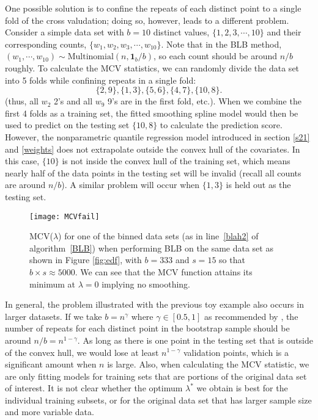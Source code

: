 \documentclass{statsoc}
\begin{document}
One possible solution is to confine the repeats of each distinct point to a single fold of the cross valudation; doing so, however, leads to a different problem. Consider a simple data set with $b=10$ distinct values, $\{1,2,3,\cdots,10\}$ and their corresponding counts, $\{w_1,w_2,w_3,\cdots,w_{10}\}$. Note that in the BLB method, $(w_1,\cdots,w_{10})\sim \text{Multinomial}(n,\mathbf{1}_b/b)$, so each count should be around $n/b$ roughly. To calculate the MCV statistics, we can randomly divide the data set into 5 folds while confining repeats in a single fold: 
$$\{2,9\},\{1,3\},\{5,6\},\{4,7\},\{10,8\}.$$
(thus, all $w_2$ 2's and all $w_9$ 9's are in the first fold, etc.). When we combine the first 4 folds as a training set, the fitted smoothing spline model would then be used to predict on the testing set $\{10,8\}$ to calculate the prediction score. However, the nonparametric quantile regression model introduced in section \ref{s21} and \ref{weights} does not extrapolate outside the convex hull of the covariates. In this case, $\{10\}$ is not inside the convex hull of the training set, which means nearly half of the data points in the testing set will be invalid (recall all counts are around $n/b$). A similar problem will occur when $\{1,3\}$ is held out as the testing set.
\begin{figure}[H]
\texttt{[image: MCVfail]}
\centering
\caption{MCV($\lambda$) for one of the binned data sets (as in line~\ref{blah2} of algorithm~\ref{BLB}) when performing BLB on the same data set as shown in Figure \ref{fig:edf}, with $b=333$ and $s=15$ so that $b\times s\approx 5000$. We can see that the MCV function attains its minimum at $\lambda=0$ implying no smoothing. 
}
\label{fig:badMCV}
\end{figure}

In general, the problem illustrated with the previous toy example also occurs in larger datasets. If we take $b=n^{\gamma}$ where $\gamma\in [0.5,1]$ as recommended by \citet{kleiner2014scalable}, the number of repeats for each distinct point in the bootstrap sample should be around $n/b=n^{1-\gamma}$. As long as there is one point in the testing set that is outside of the convex hull, we would lose at least $n^{1-\gamma}$ validation points, which is a significant amount when $n$ is large. Also, when calculating the MCV statistic, we are only fitting models for training sets that are portions of the original data set of interest. It is not clear whether the optimum $\lambda^*$ we obtain is best for the individual training subsets, or for the original data set that has larger sample size and more variable data.
\end{document}
